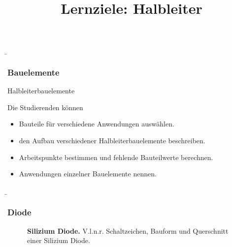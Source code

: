 \begin{frame}
    \b{ \frametitle{Bauelemente}
        \begin{Lernziele}{Halbleiterbauelemente}
            \title{Lernziele: Halbleiter}
            Die Studierenden können
            \begin{itemize}
                \item Bauteile für verschiedene Anwendungen auswählen.
                \item den Aufbau verschiedener Halbleiterbauelemente beschreiben.
                \item Arbeitspunkte bestimmen und fehlende Bauteilwerte berechnen. 
                \item Anwendungen einzelner Bauelemente nennen.
            \end{itemize}
        \end{Lernziele}  
    }
\end{frame}


\begin{frame}
    \b{\frametitle{Diode}
    \begin{figure}[H]
        \caption{\textbf{Silizium Diode.} V.l.n.r. Schaltzeichen, Bauform und Querschnitt einer Silizium Diode.} 
    \end{figure}
    }
\end{frame}

